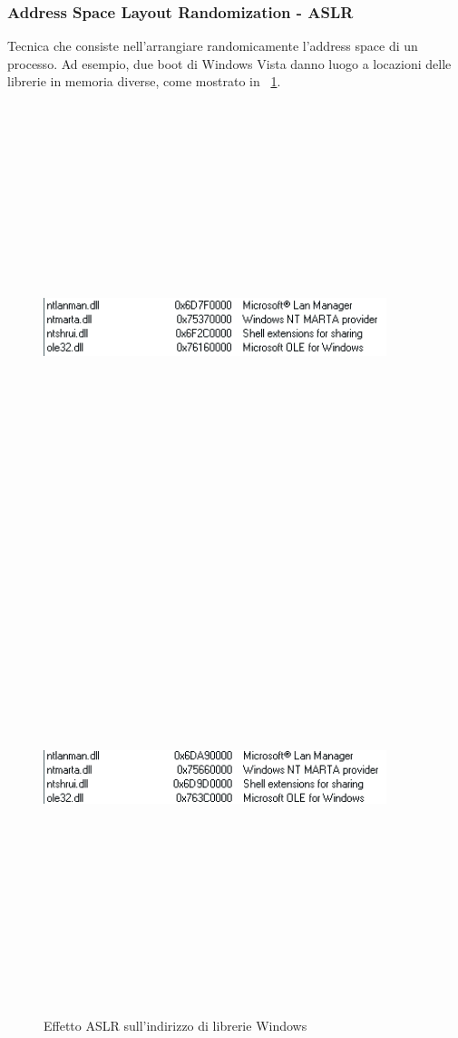 \subsubsection{Address Space Layout Randomization - ASLR}
Tecnica che consiste nell'arrangiare randomicamente l'address space di un processo. Ad esempio, due boot di Windows Vista danno luogo a locazioni delle librerie in memoria diverse, come mostrato in \figurename~\ref{fig:aslr}.
\begin{figure}[htbp]
	\centering%
	\subfigure%
	{\includegraphics[height=13cm, width=10cm, keepaspectratio]{Immagini/sistemi_operativi/aslr.png}}
	{\includegraphics[height=13cm, width=10cm, keepaspectratio]{Immagini/sistemi_operativi/aslr_2.png}}
	\caption{Effetto ASLR sull'indirizzo di librerie Windows\label{fig:aslr}} 	
\end{figure}
